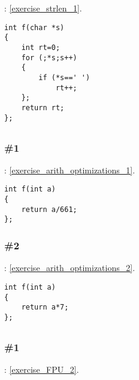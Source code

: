 \Exercise: \ref{exercise_strlen_1}.


\begin{lstlisting}
int f(char *s)
{
	int rt=0;
	for (;*s;s++)
	{
		if (*s==' ')
			rt++;
	};
	return rt;
};
\end{lstlisting}

\subsection{}

\subsubsection{\Exercise \#1}
\label{exercise_solutions_arith_optimizations_1}

\Exercise: \ref{exercise_arith_optimizations_1}.

\begin{lstlisting}
int f(int a)
{
	return a/661;
};
\end{lstlisting}

\subsubsection{\Exercise \#2}
\label{exercise_solutions_arith_optimizations_2}

\Exercise: \ref{exercise_arith_optimizations_2}.

\begin{lstlisting}
int f(int a)
{
	return a*7;
};
\end{lstlisting}

\subsection{}

\subsubsection{\Exercise \#1}
\label{exercise_solutions_FPU_2}

\Exercise: \ref{exercise_FPU_2}.


